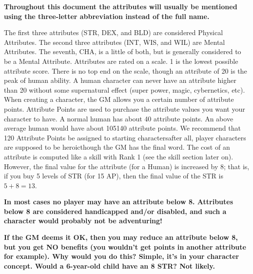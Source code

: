 \documentclass[twoside]{book}
\begin{document}
 \textbf{ Throughout this document the attributes will usually
               be mentioned using the three-letter abbreviation instead
               of the full name. }

 The first three attributes (STR, DEX, and BLD) are
               considered Physical Attributes. The second three
               attributes (INT, WIS, and WIL) are Mental Attributes. The
               seventh, CHA, is a little of both, but is generally
               considered to be a Mental Attribute.  Attributes are rated on a scale. 1 is the lowest
               possible attribute score. There is no top end on the
               scale, though an attribute of 20 is the peak of human
               ability. A human character can never have an attribute
               higher than 20 without some supernatural effect (super
               power, magic, cybernetics, etc).  When creating a character, the GM allows you a
               certain number of attribute points. Attribute Points are
               used to purchase the attribute values you want your
               character to have. A normal human has about 40 attribute
               points. An above average human would have about
               105140 attribute points. We recommend that 120
               Attribute Points be assigned to starting
               charactersafter all, player characters are supposed
               to be heroicthough the GM has the final word.
                The cost of an attribute is computed like a skill
              with Rank 1 (see the skill section later on). However, the
              final value for the attribute (for a Human) is increased by
              8; that is, if you buy 5 levels of STR (for 15 AP), then
              the final value of the STR is \ensuremath{ 5  +
               8  =    13 }.
            

 \textbf{ In most cases no player may have an attribute below
               8. Attributes below 8 are considered handicapped and/or
               disabled, and such a character would probably not be
               adventuring! }



 \textbf{ If the GM deems it OK, then you may reduce an
               attribute below 8, but you get NO benefits (you
               wouldn't get points in another attribute for
               example). Why would you do this? Simple, it's in
               your character concept. Would a 6-year-old child have an 8
               STR? Not likely. }
\end{document}
